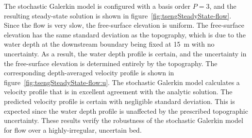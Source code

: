 The stochastic Galerkin model is configured with a basis order $P=3$, and the resulting steady-state solution is shown in figure~\ref{fig:tsengSteadyState-flow}.
Since the flow is very slow, the free-surface elevation is uniform.
The free-surface elevation has the same standard deviation as the topography, which is due to the water depth at the downstream boundary being fixed at \SI{15}{\meter} with no uncertainty.
As a result, the water depth profile is certain, and the uncertainty in the free-surface elevation is determined entirely by the topography.
The corresponding depth-averaged velocity profile is shown in figure~\ref{fig:tsengSteadyState-flow:u}.
The stochastic Galerkin model calculates a velocity profile that is in excellent agreement with the analytic solution.
The predicted velocity profile is certain with negligible standard deviation.
This is expected since the water depth profile is unaffected by the prescribed topographic uncertainty.
These results verify the robustness of the stochastic Galerkin model for flow over a highly-irregular, uncertain bed.